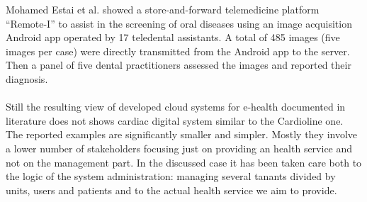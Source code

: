 Mohamed Estai et al. showed a store-and-forward telemedicine platform “Remote-I” to assist in the screening of oral diseases using an image acquisition Android app operated by 17 teledental assistants. A total of 485 images (five images per case) were directly transmitted from the Android app to the server. Then a panel of five dental practitioners assessed the images and reported their diagnosis.\cite{mohamedestai}\\ \\
Still the resulting view of developed cloud systems for e-health documented in literature does not shows cardiac digital system similar to the Cardioline one. The reported examples are significantly smaller and simpler. Mostly they involve a lower number of stakeholders focusing just on providing an health service and not on the management part. In the discussed case it has been taken care both to the logic of the system administration: managing several tanants divided by units, users and patients and to the actual health service we aim to provide.